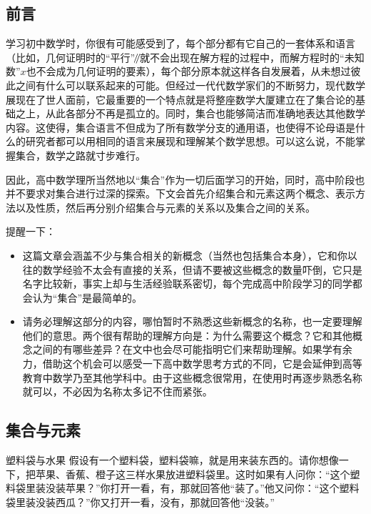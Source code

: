 
\begin{issues}
\issueDraft
\end{issues}

\subsection{前言}

学习初中数学时，你很有可能感受到了，每个部分都有它自己的一套体系和语言（比如，几何证明时的“平行”$\mathbin{\!/\mkern-5mu/\!}$就不会出现在解方程的过程中，而解方程时的“未知数”$x$也不会成为几何证明的要素），每个部分原本就这样各自发展着，从未想过彼此之间有什么可以联系起来的可能。但经过一代代数学家们的不断努力，现代数学展现在了世人面前，它最重要的一个特点就是将整座数学大厦建立在了集合论的基础之上，从此各部分不再是孤立的。同时，集合也能够简洁而准确地表达其他数学内容。这使得，集合语言不但成为了所有数学分支的通用语，也使得不论母语是什么的研究者都可以用相同的语言来展现和理解某个数学思想。可以这么说，不能掌握集合，数学之路就寸步难行。

因此，高中数学理所当然地以“集合”作为一切后面学习的开始，同时，高中阶段也并不要求对集合进行过深的探索。下文会首先介绍集合和元素这两个概念、表示方法以及性质，然后再分别介绍集合与元素的关系以及集合之间的关系。

提醒一下：
\begin{itemize}
\item 这篇文章会涵盖不少与集合相关的新概念（当然也包括集合本身），它和你以往的数学经验不太会有直接的关系，但请不要被这些概念的数量吓倒，它只是名字比较新，事实上却与生活经验联系密切，每个完成高中阶段学习的同学都会认为“集合”是最简单的。
\item 请务必理解这部分的内容，哪怕暂时不熟悉这些新概念的名称，也一定要理解他们的意思。两个很有帮助的理解方向是：为什么需要这个概念？它和其他概念之间的有哪些差异？在文中也会尽可能指明它们来帮助理解。如果学有余力，借助这个机会可以感受一下高中数学思考方式的不同，它是会延伸到高等教育中数学乃至其他学科中。由于这些概念很常用，在使用时再逐步熟悉名称就可以，不必因为名称太多记不住而紧张。
\end{itemize}

\subsection{集合与元素}

\begin{example}{塑料袋与水果}
假设有一个塑料袋，塑料袋嘛，就是用来装东西的。请你想像一下，把苹果、香蕉、橙子这三样水果放进塑料袋里。这时如果有人问你：“这个塑料袋里装没装苹果？”你打开一看，有，那就回答他“装了。”他又问你：“这个塑料袋里装没装西瓜？”你又打开一看，没有，那就回答他“没装。”
\end{example}

